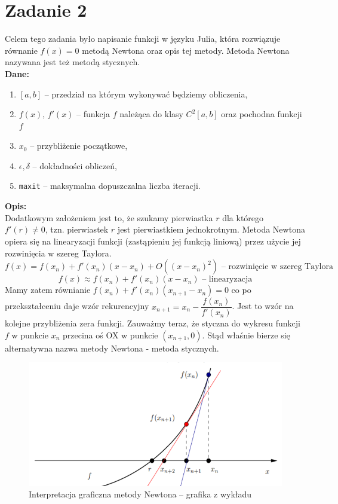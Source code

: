 \documentclass[]{article}
\begin{document}
	
	\clearpage
	
	\section*{Zadanie 2}
	
	Celem tego zadania było napisanie funkcji w języku Julia, która rozwiązuje równanie $f(x) = 0$ metodą Newtona oraz opis tej metody. Metoda Newtona nazywana jest też metodą stycznych.\\
	\textbf{Dane:}
	\begin{enumerate}[]
		\item $[a,b]$ -- przedział na którym wykonywać będziemy obliczenia,
		\item $f(x)$, $f'(x)$  -- funkcja $f$ należąca do klasy $C^2[a,b]$ oraz pochodna funkcji $f$
		\item $x_0$ -- przybliżenie początkowe,
		\item $\epsilon, \delta$ -- dokładności obliczeń,
		\item \texttt{maxit} -- maksymalna dopuszczalna liczba iteracji.
	\end{enumerate}
	\textbf{Opis:}\\
	Dodatkowym założeniem jest to, że szukamy pierwiastka $r$ dla którego $f'(r)\ne0$, tzn. pierwiastek $r$ jest pierwiastkiem jednokrotnym. Metoda Newtona opiera się na linearyzacji funkcji (zastąpieniu jej funkcją liniową) przez użycie jej rozwinięcia w szereg Taylora.
	$$f(x) = f(x_n ) + f'(x_n )(x-x_n) + O((x-x_n )^2)\text{ -- rozwinięcie w szereg Taylora}$$
	$$f(x)\approx f(x_n ) + f'(x_n )(x-x_n) \text{ -- linearyzacja}$$
	Mamy zatem równianie $f(x_n ) + f'(x_n )(x_{n+1}-x_n) = 0$ co po przekształceniu daje wzór rekurencyjny $x_{n+1} = x_n - \dfrac{f(x_n)}{f'(x_n)}$. Jest to wzór na kolejne przybliżenia zera funkcji.  Zauważmy teraz, że styczna do wykresu funkcji $f$ w punkcie $x_n$ przecina oś OX w punkcie $(x_{n+1},0)$. Stąd właśnie bierze się alternatywna nazwa metody Newtona - metoda stycznych.
	\begin{figure}[!htbp]
		\includegraphics[scale=0.7]{newton}
		\centering
		\caption{Interpretacja graficzna metody Newtona -- grafika z wykładu}
	\end{figure}
\end{document}
